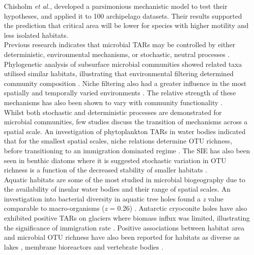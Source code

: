 \noindent Chisholm \textit{et al.,} developed a parsimonious mechanistic model to test their hypotheses, and applied it to 100 archipelago datasets. Their results supported the prediction that critical area will be lower for species with higher motility and less isolated habitats. \\

\noindent Previous research indicates that microbial TARs may be controlled by either deterministic, environmental mechanisms, or stochastic, neutral processes \cite{StegenJamesC2012Sada}. Phylogenetic analysis of subsurface microbial communities showed related taxa utilised similar habitats, illustrating that environmental filtering determined community composition \cite{StegenJamesC2012Sada}. Niche filtering also had a greater influence in the most spatially and temporally varied environments \cite{StegenJamesC2012Sada}. The relative strength of these mechanisms has also been shown to vary with community functionality \cite{CarusoTancredi2011Sadp}. \\

\noindent Whilst both stochastic and deterministic processes are demonstrated for microbial communities, few studies discuss the transition of mechanisms across a spatial scale. An investigation of phytoplankton TARs in water bodies indicated that for the smallest spatial scales, niche relations determine OTU richness, before transitioning to an immigration dominated regime \cite{varbiro2017functional}. The SIE has also been seen in benthic diatoms where it is suggested stochastic variation in OTU richness is a function of the decreased stability of smaller habitats \cite{bolgovics2016species}. \\

\noindent Aquatic habitats are some of the most studied in microbial biogeography due to the availability of insular water bodies and their range of spatial scales. An investigation into bacterial diversity in aquatic tree holes found a \textit{z} value comparable to macro-organisms (\textit{z} = 0.26) \cite{bell2005larger}. Antarctic cryoconite holes have also exhibited positive TARs on glaciers where biomass influx was limited, illustrating the significance of immigration rate \cite{darcy2018island}. Positive associations between habitat area and microbial OTU richness have also been reported for habitats as diverse as lakes \cite{battes2019species}, membrane bioreactors \cite{van2006bacterial} \cite{van2005island} and vertebrate bodies \cite{godon2016vertebrate}.\\

